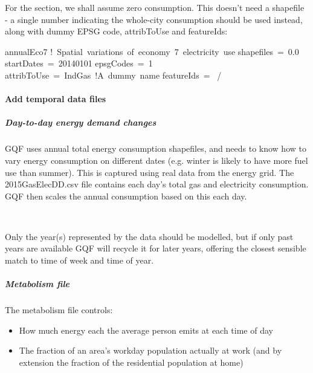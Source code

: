 \documentclass[letterpaper,10pt,english]{sphinxmanual}
\begin{document}
For the  section, we shall assume zero consumption. This
doesn’t need a shapefile - a single number indicating the whole-city
consumption should be used instead, along with dummy EPSG code,
attribToUse and featureIds:

%
\begin{sphinxVerbatim}[commandchars=\\\{\}]
\PYGZam{}annualEco7
   ! Spatial variations of economy 7 electricity use
   shapefiles = 0.0
   startDates = \PYGZsq{}2014\PYGZhy{}01\PYGZhy{}01\PYGZsq{}
   epsgCodes = 1
   attribToUse = \PYGZsq{}IndGas\PYGZsq{} !A dummy name
   featureIds = \PYGZsq{}\PYGZsq{}
/
\end{sphinxVerbatim}


\paragraph{Add temporal data files}
\label{\detokenize{Tutorials/GQF:add-temporal-data-files}}

\subparagraph{Day-to-day energy demand changes}
\label{\detokenize{Tutorials/GQF:day-to-day-energy-demand-changes}}
GQF uses annual total energy consumption shapefiles, and needs to know
how to vary energy consumption on different dates (e.g. winter is likely
to have more fuel use than summer). This is captured using real data
from the energy grid. The 2015GasElecDD.csv file contains each day’s
total gas and electricity consumption. GQF then scales the annual
consumption based on this each day.

%
\begin{sphinxVerbatim}[commandchars=\\\{\}]
        
     
\end{sphinxVerbatim}

Only the year(s) represented by the data should be modelled, but if only
past years are available GQF will recycle it for later years, offering
the closest sensible match to time of week and time of year.


\subparagraph{Metabolism file}
\label{\detokenize{Tutorials/GQF:metabolism-file}}
The metabolism file controls:
\begin{itemize}
\item {} 
How much energy each the average person emits at each time of day

\item {} 
The fraction of an area’s workday population actually at work (and by
extension the fraction of the residential population at home)

\end{itemize}
\end{document}

